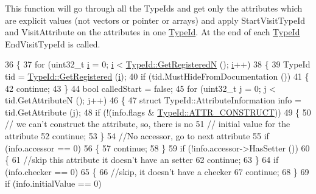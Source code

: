 This function will go through all the Type\+Ids and get only the attributes which are explicit values (not vectors or pointer or arrays) and apply Start\+Visit\+Type\+Id and Visit\+Attribute on the attributes in one \hyperlink{classns3_1_1TypeId}{Type\+Id}. At the end of each \hyperlink{classns3_1_1TypeId}{Type\+Id} End\+Visit\+Type\+Id is called. 


\begin{DoxyCode}
36 \{
37   \textcolor{keywordflow}{for} (uint32\_t \hyperlink{bernuolliDistribution_8m_a6f6ccfcf58b31cb6412107d9d5281426}{i} = 0; \hyperlink{bernuolliDistribution_8m_a6f6ccfcf58b31cb6412107d9d5281426}{i} < \hyperlink{classns3_1_1TypeId_a87c96c0c7ef389488be43aa4194f818a}{TypeId::GetRegisteredN} (); \hyperlink{bernuolliDistribution_8m_a6f6ccfcf58b31cb6412107d9d5281426}{i}++)
38     \{
39       TypeId tid = \hyperlink{classns3_1_1TypeId_a19fe68b77ecc4e29c0637e543365affc}{TypeId::GetRegistered} (\hyperlink{bernuolliDistribution_8m_a6f6ccfcf58b31cb6412107d9d5281426}{i});
40       \textcolor{keywordflow}{if} (tid.MustHideFromDocumentation ())
41         \{
42           \textcolor{keywordflow}{continue};
43         \}
44       \textcolor{keywordtype}{bool} calledStart = \textcolor{keyword}{false};
45       \textcolor{keywordflow}{for} (uint32\_t j = 0; j < tid.GetAttributeN (); j++)
46         \{
47           \textcolor{keyword}{struct }TypeId::AttributeInformation info = tid.GetAttribute (j);
48           \textcolor{keywordflow}{if} (!(info.flags & \hyperlink{classns3_1_1TypeId_a3ab7b43b95f96391c514d609ca60e542aa8dc1d5d889cc9489244c94ede243d62}{TypeId::ATTR\_CONSTRUCT}))
49             \{
50               \textcolor{comment}{// we can't construct the attribute, so, there is no}
51               \textcolor{comment}{// initial value for the attribute}
52               \textcolor{keywordflow}{continue};
53             \}
54           \textcolor{comment}{//No accessor, go to next attribute}
55           \textcolor{keywordflow}{if} (info.accessor == 0)
56             \{
57               \textcolor{keywordflow}{continue};
58             \}
59           \textcolor{keywordflow}{if} (!info.accessor->HasSetter ())
60             \{
61               \textcolor{comment}{//skip this attribute it doesn't have an setter}
62               \textcolor{keywordflow}{continue};
63             \}
64           \textcolor{keywordflow}{if} (info.checker == 0)
65             \{
66               \textcolor{comment}{//skip, it doesn't have a checker}
67               \textcolor{keywordflow}{continue};
68             \}
69           \textcolor{keywordflow}{if} (info.initialValue == 0)

\end{DoxyCode}

